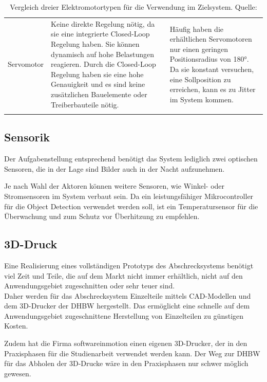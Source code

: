 \begin{longtable}{ p{}|p{}|p{} }
    Servomotor &
    Keine direkte Regelung nötig, da sie eine integrierte Closed-Loop Regelung haben. \newline
    Sie können dynamisch auf hohe Belastungen reagieren. \newline
    Durch die Closed-Loop Regelung haben sie eine hohe Genauigkeit und es sind keine zusätzlichen Bauelemente oder Treiberbauteile nötig.
    &
    Häufig haben die erhältlichen Servomotoren nur einen geringen Positionsradius von 180°. \newline
    Da sie konstant versuchen, eine Sollposition zu erreichen, kann es zu Jitter im System kommen.
    \\
    \caption{Vergleich dreier Elektromotortypen für die Verwendung im Zielsystem. Quelle: \cite{motors_seed}}
    \label{tab:el_motors}
\end{longtable}


\subsection{Sensorik}

Der Aufgabenstellung entsprechend benötigt das System lediglich zwei optischen Sensoren, die in der Lage sind Bilder auch in der Nacht aufzunehmen.

Je nach Wahl der Aktoren können weitere Sensoren, wie Winkel- oder Stromsensoren im System verbaut sein. Da ein leistungsfähiger Mikrocontroller für die Object Detection verwendet werden soll, ist ein Temperatursensor für die Überwachung und zum Schutz vor Überhitzung zu empfehlen.

\subsection{3D-Druck}

Eine Realisierung eines vollständigen Prototyps des Abschrecksystems benötigt viel Zeit und Teile, die auf dem Markt nicht immer erhältlich, nicht auf den Anwendungsgebiet zugeschnitten oder sehr teuer sind.\\
Daher werden für das Abschrecksystem Einzelteile mittels CAD-Modellen und dem 3D-Drucker der DHBW hergestellt. Das ermöglicht eine schnelle auf dem Anwendungsgebiet zugeschnittene Herstellung von Einzelteilen zu günstigen Kosten.

Zudem hat die Firma softwareinmotion einen eigenen 3D-Drucker, der in den Praxisphasen für die Studienarbeit verwendet werden kann. Der Weg zur DHBW für das Abholen der 3D-Drucke wäre in den Praxisphasen nur schwer möglich gewesen.

